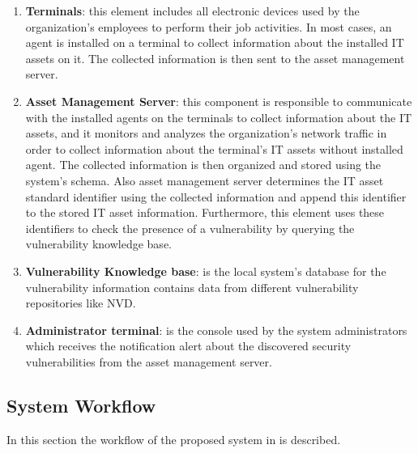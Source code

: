 \documentclass{llncs}
\begin{document}
 \begin{enumerate}
 \item \textbf{Terminals}: this element includes all electronic devices used by the organization's employees to perform their job activities. In most cases, an agent is installed on a terminal to collect information about the installed IT assets on it. The collected information is then sent to the asset management server.
 
 \item \textbf{Asset Management Server}: this component is responsible to communicate with the installed agents on the terminals to collect information about the IT assets, and it monitors and analyzes the organization's network traffic in order to collect information about the terminal's IT assets without installed agent. The collected information is then organized and stored using the system's schema. Also asset management server determines the IT asset standard identifier using the collected information and append this identifier to the stored IT asset information. Furthermore, this element uses these identifiers to check the presence of a vulnerability by querying the vulnerability knowledge base.
 
 \item \textbf{Vulnerability Knowledge base}: is the local system's database for the vulnerability information contains data from different vulnerability repositories like NVD.
 
 
  \item \textbf{Administrator terminal}: is the console used by the system administrators which receives the notification alert about the discovered security vulnerabilities from the asset management server.     
 \end{enumerate}
 

\subsection{System Workflow}

\par In this section the workflow of the proposed system in \cite{paper1} is described.
 
\end{document}
